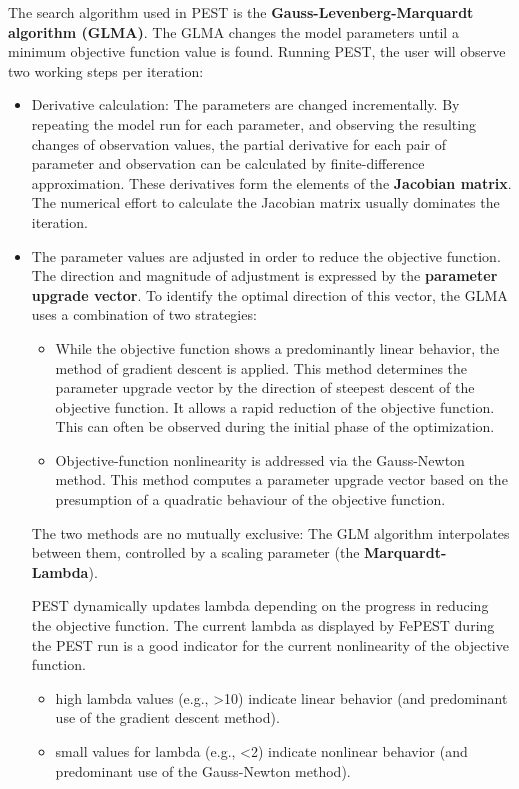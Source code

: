 The search algorithm used in PEST is the \textbf{Gauss-Levenberg-Marquardt algorithm (GLMA)}. The GLMA changes the model parameters until a minimum objective function value is found. Running PEST, the user will observe two working steps per iteration:
\begin{itemize}
\item Derivative calculation: The parameters are changed incrementally. By repeating the model run for each parameter, and observing the resulting changes of observation values, the partial derivative for each pair of parameter and observation can be calculated by finite-difference approximation. These derivatives form the elements of the \textbf{Jacobian matrix}. The numerical effort to calculate the Jacobian matrix usually dominates the iteration.
\item The parameter values are adjusted in order to reduce the objective function. The direction and magnitude of adjustment is expressed by the \textbf{parameter upgrade vector}. To identify the optimal direction of this vector, the GLMA uses a combination of two strategies:

\begin{itemize}
\item While the objective function shows a predominantly linear behavior, the method of gradient descent is applied. This method determines the parameter upgrade vector by the direction of steepest descent of the objective function. It allows a rapid reduction of the objective function. This can often be observed during the initial phase of the optimization.
\item Objective-function nonlinearity is addressed via the Gauss-Newton method. This method computes a parameter upgrade vector based on the presumption of a quadratic behaviour of the objective function.
\end{itemize}

The two methods are no mutually exclusive: The GLM algorithm interpolates between them, controlled by a scaling parameter (the \textbf{Marquardt-Lambda}). 

PEST dynamically updates lambda depending on the progress in reducing the objective function. The current lambda as displayed by FePEST during the PEST run is a good indicator for the current nonlinearity of the objective function. 

\begin{itemize}
\item high lambda values (e.g., \textgreater 10) indicate linear behavior (and predominant use of the gradient descent method).
\item small values for lambda (e.g., \textless 2) indicate nonlinear behavior (and predominant use of the Gauss-Newton method).
\end{itemize}


\end{itemize}
